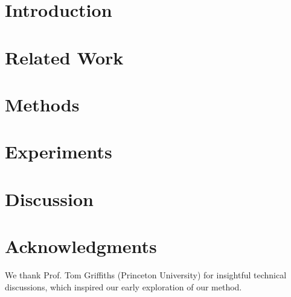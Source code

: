 \documentclass{article}
\begin{document}
\section{Introduction}


\section{Related Work}
\label{sect:related}


% 


\section{Methods}
\label{sect:method}

% 
% 

\vspace{3pt}
\section{Experiments}
\vspace{3pt}
\label{sect:experiment}


% 
\vspace{-5pt}
\section{Discussion}
\vspace{3pt}
\label{sect:conclusion}


\section*{Acknowledgments}
We thank Prof. Tom Griffiths (Princeton University) for insightful technical discussions, which inspired our early exploration of our method.




\appendix

\end{document}
